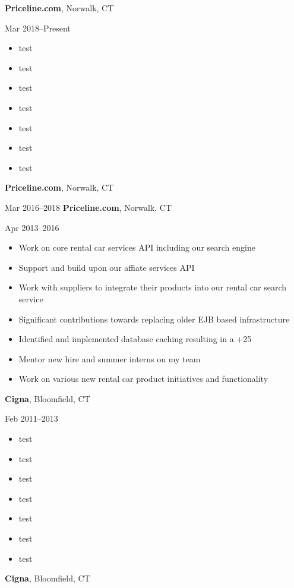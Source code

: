 \documentclass[a4paper,online]{adcv}
\begin{document}
\begin{adcvtabletwo}
  {\textbf{Priceline.com}, Norwalk, CT}
  
   {Mar 2018--Present}
  \begin{itemize}
    \item test
    \item test
    \item test
    \item test
    \item test
    \item test
    \item test
  \end{itemize}
  \adcvrowskip
  {\textbf{Priceline.com}, Norwalk, CT}
  
   {Mar 2016--2018}
  \adcvrowskip
  {\textbf{Priceline.com}, Norwalk, CT}
  
   {Apr 2013--2016}
  \begin{itemize}
    \item Work on core rental car services API including our search engine
    \item Support and build upon our affiate services API
    \item Work with suppliers to integrate their products into our rental car search service
    \item Significant contributions towards replacing older EJB based infrastructure
    \item Identified and implemented database caching resulting in a +25%
    \item Mentor new hire and summer interns on my team
    \item Work on various new rental car product initiatives and functionality
  \end{itemize}
  \adcvrowskip
  {\textbf{Cigna}, Bloomfield, CT}
  
   {Feb 2011--2013}
  \begin{itemize}
    \item test
    \item test
    \item test
    \item test
    \item test
    \item test
    \item test
  \end{itemize}
  \adcvrowskip
  {\textbf{Cigna}, Bloomfield, CT}
  

\end{adcvtabletwo}
\end{document}
